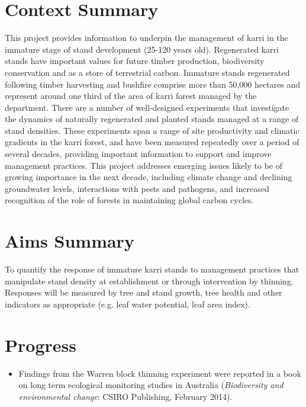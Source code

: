 \documentclass[version=last, paper=a4, DIV=18, usenames, dvipsnames]{scrartcl}
\begin{document}
%

%




\section*{Context Summary}
This project provides information to underpin the management of karri in
the immature stage of stand development (25-120 years old). Regenerated
karri stands have important values for future timber production,
biodiversity conservation and as a store of terrestrial carbon. Immature
stands regenerated following timber harvesting and bushfire comprise
more than 50,000 hectares and represent around one third of the area of
karri forest managed by the department. There are a number of
well-designed experiments that investigate the dynamics of naturally
regenerated and planted stands managed at a range of stand densities.
These experiments span a range of site productivity and climatic
gradients in the karri forest, and have been measured repeatedly over a
period of several decades, providing important information to support
and improve management practices. This project addresses emerging issues
likely to be of growing importance in the next decade, including climate
change and declining groundwater levels, interactions with pests and
pathogens, and increased recognition of the role of forests in
maintaining global carbon cycles.



\section*{Aims Summary}
To quantify the response of immature karri stands to management
practices that manipulate stand density at establishment or through
intervention by thinning. Responses will be measured by tree and stand
growth, tree health and other indicators as appropriate (e.g. leaf water
potential, leaf area index).



\section*{Progress}
\begin{itemize}
\itemsep1pt\parskip0pt
\item
  Findings from the Warren block thinning experiment were reported in a
  book on long term ecological monitoring studies in Australia
  (\emph{Biodiversity and environmental change}: CSIRO Publishing,
  February 2014).
\end{itemize}
\end{document}
